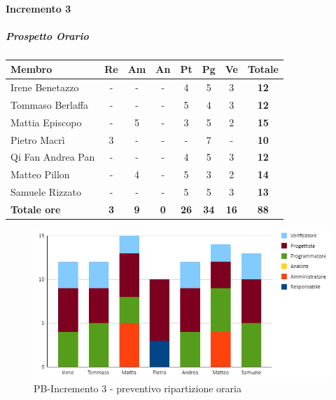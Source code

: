 \paragraph{Incremento 3}
\subparagraph{Prospetto Orario}
\begin{center}
	\renewcommand{\arraystretch}{1.8} %
	\begin{tabular}{ |m{10em}|c|c|c|c|c|c|c| }
	\hline
	\textbf{Membro} & \textbf{Re} & \textbf{Am} &  \textbf{An} &  \textbf{Pt} &  \textbf{Pg} &  \textbf{Ve} &  \textbf{Totale}\\
    \hline
    Irene Benetazzo   & - & - & - & 4 & 5 & 3 & \textbf{12} \\
    \hline
    Tommaso Berlaffa  & - & - & - & 5 & 4 & 3 & \textbf{12} \\
    \hline
    Mattia Episcopo   & - & 5 & - & 3 & 5 & 2 & \textbf{15} \\
    \hline
    Pietro Macrì      & 3 & - & - & - & 7 & - & \textbf{10} \\
    \hline
    Qi Fan Andrea Pan & - & - & - & 4 & 5 & 3 & \textbf{12} \\
    \hline
    Matteo Pillon     & - & 4 & - & 5 & 3 & 2 & \textbf{14} \\
    \hline
    Samuele Rizzato   & - & - & - & 5 & 5 & 3 & \textbf{13} \\
    \hline
    \textbf{Totale ore} & \textbf{3} & \textbf{9} &  \textbf{0} &  \textbf{26} &  \textbf{34} &  \textbf{16} &  \textbf{88}\\
    \hline
	\end{tabular}
\end{center}
\begin{figure}[H]
   \centering\includegraphics{images/preventivo/PB-incremento3-ore.png}
   \caption{PB-Incremento 3 - preventivo ripartizione oraria}
\end{figure}


